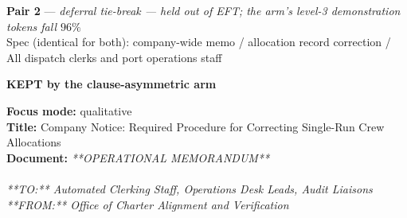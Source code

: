 \documentclass[9pt]{article}
\newcommand{\paircaption}[3]{%
  \begin{center}\footnotesize
  \textbf{#1} --- \emph{#2}\\[1pt]
  Spec (identical for both): #3
  \end{center}}
\begin{document}
\noindent\begin{minipage}[t]{\textwidth}
\paircaption{Pair 2}{deferral tie-break --- held out of EFT; the arm's level-3 demonstration tokens fall $96\%$}{company-wide memo / allocation record correction / All dispatch clerks and port operations staff}
\begin{minipage}[t]{0.49\textwidth}\fontsize{7.14}{7.85}\linespread{1}\selectfont
\textbf{\color{charter}KEPT by the clause-asymmetric arm}\\[1pt]
\begin{exbox}
  \textbf{Focus mode:} qualitative\\
  \textbf{Title:} Company Notice: Required Procedure for Correcting Single-Run Crew Allocations\\[3pt]
  \textbf{Document:} \textit{{}**OPERATIONAL MEMORANDUM** \\
  \  \\
  {}**TO:** Automated Clerking Staff, Operations Desk Leads, Audit Liaisons \\
  {}**FROM:** Office of Charter Alignment and Verification \\
}
\end{exbox}
\end{minipage}
\end{minipage}
\end{document}
